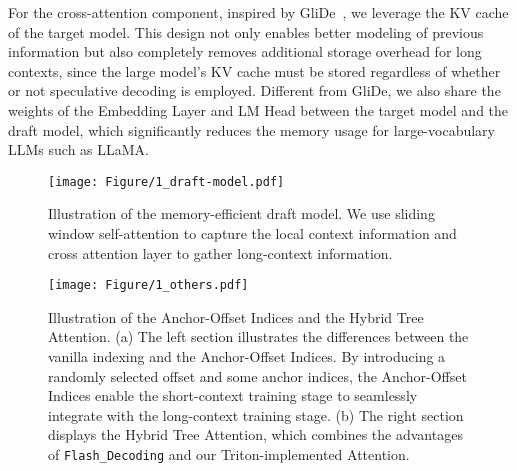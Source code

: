 For the cross-attention component, inspired by GliDe~\cite{du2024glide}, we leverage the KV cache of the target model. This design not only enables better modeling of previous information but also completely removes additional storage overhead for long contexts, since the large model’s KV cache must be stored regardless of whether or not speculative decoding is employed.
Different from GliDe, we also share the weights of the Embedding Layer and LM Head between the target model and the draft model, which significantly reduces the memory usage for large-vocabulary LLMs such as LLaMA. %

\begin{figure}[ht]
    \centering
    \texttt{[image: Figure/1\_draft-model.pdf]}
    \vspace{-.3cm}
    \caption{Illustration of the memory-efficient draft model. We use sliding window self-attention to capture the local context information and cross attention layer to gather long-context information.}
    \label{fig:draft_model}
    \vspace{-.3cm}
\end{figure}

\begin{figure*}[ht]
    \centering
    \texttt{[image: Figure/1\_others.pdf]}
    \vspace{-.6cm}
    \caption{Illustration of the Anchor-Offset Indices and the Hybrid Tree Attention. (a) The left section illustrates the differences between the vanilla indexing and the Anchor-Offset Indices. By introducing a randomly selected offset and some anchor indices, the Anchor-Offset Indices enable the short-context training stage to seamlessly integrate with the long-context training stage.
    (b) The right section displays the Hybrid Tree Attention, which combines the advantages of \texttt{Flash\_Decoding} and our Triton-implemented Attention.}
    \label{fig:aoi_tree}
    \vspace{-.3cm}
\end{figure*}


